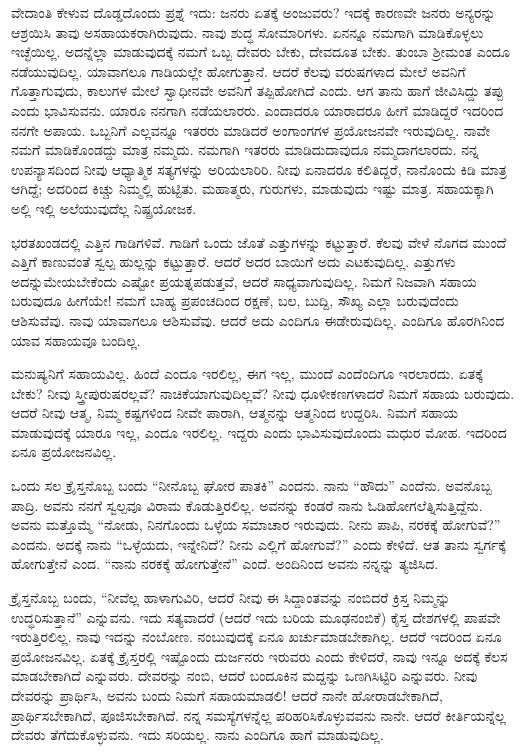 ವೇದಾಂತಿ ಕೇಳುವ ದೊಡ್ಡದೊಂದು ಪ್ರಶ್ನೆ ಇದು: ಜನರು ಏತಕ್ಕೆ ಅಂಜುವರು? ಇದಕ್ಕೆ ಕಾರಣವೇ ಜನರು ಅನ್ಯರನ್ನು ಆಶ್ರಯಿಸಿ ತಾವು ಅಸಹಾಯಕರಾಗಿರುವುದು. ನಾವು ಶುದ್ಧ ಸೋಮಾರಿಗಳು. ಏನನ್ನೂ ನಮಗಾಗಿ ಮಾಡಿಕೊಳ್ಳಲು ಇಚ್ಛೆಯಿಲ್ಲ. ಅದನ್ನೆಲ್ಲಾ ಮಾಡುವುದಕ್ಕೆ ನಮಗೆ ಒಬ್ಬ ದೇವರು ಬೇಕು, ದೇವದೂತ ಬೇಕು. ತುಂಬಾ ಶ‍್ರೀಮಂತ ಎಂದೂ ನಡೆಯುವುದಿಲ್ಲ. ಯಾವಾಗಲೂ ಗಾಡಿಯಲ್ಲೇ ಹೋಗುತ್ತಾನೆ. ಆದರೆ ಕೆಲವು ವರುಷಗಳಾದ ಮೇಲೆ ಅವನಿಗೆ ಗೊತ್ತಾಗುವುದು, ಕಾಲುಗಳ ಮೇಲೆ ಸ್ವಾಧೀನವೇ ಅವನಿಗೆ ತಪ್ಪಿಹೋಗಿದೆ ಎಂದು. ಆಗ ತಾನು ಹಾಗೆ ಜೀವಿಸಿದ್ದು ತಪ್ಪು ಎಂದು ಭಾವಿಸುವನು. ಯಾರೂ ನನಗಾಗಿ ನಡೆಯಲಾರರು. ಎಂದಾದರೂ ಯಾರಾದರೂ ಹೀಗೆ ಮಾಡಿದ್ದರೆ ಇದರಿಂದ ನನಗೇ ಅಪಾಯ. ಒಬ್ಬನಿಗೆ ಎಲ್ಲವನ್ನೂ ಇತರರು ಮಾಡಿದರೆ ಅಂಗಾಂಗಗಳ ಪ್ರಯೋಜನವೇ ಇರುವುದಿಲ್ಲ. ನಾವೇ ನಮಗೆ ಮಾಡಿಕೊಂಡದ್ದು ಮಾತ್ರ ನಮ್ಮದು. ನಮಗಾಗಿ ಇತರರು ಮಾಡಿದುದಾವುದೂ ನಮ್ಮದಾಗಲಾರದು. ನನ್ನ ಉಪನ್ಯಾಸದಿಂದ ನೀವು ಆಧ್ಯಾತ್ಮಿಕ ಸತ್ಯಗಳನ್ನು ಅರಿಯಲಾರಿರಿ. ನೀವು ಏನಾದರೂ ಕಲಿತಿದ್ದರೆ, ನಾನೊಂದು ಕಿಡಿ ಮಾತ್ರ ಆಗಿದ್ದೆ; ಅದರಿಂದ ಕಿಚ್ಚು ನಿಮ್ಮಲ್ಲಿ ಹುಟ್ಟಿತು. ಮಹಾತ್ಮರು, ಗುರುಗಳು, ಮಾಡುವುದು ಇಷ್ಟು ಮಾತ್ರ. ಸಹಾಯಕ್ಕಾಗಿ ಅಲ್ಲಿ ಇಲ್ಲಿ ಅಲೆಯುವುದೆಲ್ಲ ನಿಷ್ಪ್ರಯೋಜಕ.

ಭರತಖಂಡದಲ್ಲಿ ಎತ್ತಿನ ಗಾಡಿಗಳಿವೆ. ಗಾಡಿಗೆ ಒಂದು ಜೊತೆ ಎತ್ತುಗಳನ್ನು ಕಟ್ಟುತ್ತಾರೆ. ಕೆಲವು ವೇಳೆ ನೊಗದ ಮುಂದೆ ಎತ್ತಿಗೆ ಕಾಣುವಂತೆ ಸ್ವಲ್ಪ ಹುಲ್ಲನ್ನು ಕಟ್ಟುತ್ತಾರೆ. ಆದರೆ ಅದರ ಬಾಯಿಗೆ ಅದು ಎಟಕುವುದಿಲ್ಲ. ಎತ್ತುಗಳು ಅದನ್ನು\break ಮೇಯಬೇಕೆಂದು ಎಷ್ಟೋ ಪ್ರಯತ್ನಪಡುತ್ತವೆ, ಆದರೆ ಸಾಧ್ಯವಾಗುವುದಿಲ್ಲ. ನಿಮಗೆ ನಿಜವಾಗಿ ಸಹಾಯ ಬರುವುದೂ ಹೀಗೆಯೇ! ನಮಗೆ ಬಾಹ್ಯ ಪ್ರಪಂಚದಿಂದ ರಕ್ಷಣೆ, ಬಲ, ಬುದ್ದಿ, ಸೌಖ್ಯ ಎಲ್ಲಾ ಬರುವುದೆಂದು ಆಶಿಸುವೆವು. ನಾವು ಯಾವಾಗಲೂ ಆಶಿಸುವೆವು. ಆದರೆ ಅದು ಎಂದಿಗೂ ಈಡೇರುವುದಿಲ್ಲ. ಎಂದಿಗೂ ಹೊರಗಿನಿಂದ ಯಾವ ಸಹಾಯವೂ ಬಂದಿಲ್ಲ.

ಮನುಷ್ಯನಿಗೆ ಸಹಾಯವಿಲ್ಲ. ಹಿಂದೆ ಎಂದೂ ಇರಲಿಲ್ಲ, ಈಗ ಇಲ್ಲ, ಮುಂದೆ ಎಂದೆಂದಿಗೂ ಇರಲಾರದು. ಏತಕ್ಕೆ ಬೇಕು? ನೀವು ಸ್ತ್ರೀಪುರುಷರಲ್ಲವೆ? ನಾಚಿಕೆಯಾಗುವುದಿಲ್ಲವೆ? ನೀವು ಧೂಳೀಕಣಗಳಾದರೆ ನಿಮಗೆ ಸಹಾಯ ಬರುವುದು. ಆದರೆ ನೀವು ಆತ್ಮ, ನಿಮ್ಮ ಕಷ್ಟಗಳಿಂದ ನೀವೇ ಪಾರಾಗಿ, ಆತ್ಮನನ್ನು ಆತ್ಮನಿಂದ ಉದ್ದರಿಸಿ. ನಿಮಗೆ ಸಹಾಯ ಮಾಡುವುದಕ್ಕೆ ಯಾರೂ ಇಲ್ಲ, ಎಂದೂ ಇರಲಿಲ್ಲ. ಇದ್ದರು ಎಂದು ಭಾವಿಸುವುದೊಂದು ಮಧುರ ಮೋಹ. ಇದರಿಂದ ಏನೂ ಪ್ರಯೋಜನವಿಲ್ಲ.

ಒಂದು ಸಲ ಕ್ರೈಸ್ತನೊಬ್ಬ ಬಂದು “ನೀನೊಬ್ಬ ಘೋರ ಪಾತಕಿ'' ಎಂದನು. ನಾನು “ಹೌದು” ಎಂದೆನು. ಅವನೊಬ್ಬ ಪಾದ್ರಿ. ಅವನು ನನಗೆ ಸ್ವಲ್ಪವೂ ವಿರಾಮ ಕೊಡುತ್ತಿರಲಿಲ್ಲ. ಅವನನ್ನು ಕಂಡರೆ ನಾನು ಓಡಿಹೋಗಲೆತ್ನಿಸುತ್ತಿದ್ದೆನು. ಅವನು ಮತ್ತೊಮ್ಮೆ “ನೋಡು, ನಿನಗೊಂದು ಒಳ್ಳೆಯ ಸಮಾಚಾರ ಇರುವುದು. ನೀನು ಪಾಪಿ, ನರಕಕ್ಕೆ ಹೋಗುವೆ?'' ಎಂದನು. ಅದಕ್ಕೆ ನಾನು “ಒಳ್ಳೆಯದು, ಇನ್ನೇನಿದೆ? ನೀನು ಎಲ್ಲಿಗೆ ಹೋಗುವೆ?” ಎಂದು ಕೇಳಿದೆ. ಆತ ತಾನು ಸ್ವರ್ಗಕ್ಕೆ ಹೋಗುತ್ತೇನೆ ಎಂದ. “ನಾನು ನರಕಕ್ಕೆ ಹೋಗುತ್ತೇನೆ'' ಎಂದೆ. ಅಂದಿನಿಂದ ಅವನು ನನ್ನನ್ನು ತ್ಯಜಿಸಿದ.

ಕ್ರೈಸ್ತನೊಬ್ಬ ಬಂದು, “ನೀವೆಲ್ಲ ಹಾಳಾಗುವಿರಿ, ಆದರೆ ನೀವು ಈ ಸಿದ್ದಾಂತವನ್ನು ನಂಬಿದರೆ ಕ್ರಿಸ್ತ ನಿಮ್ಮನ್ನು ಉದ್ಧರಿಸುತ್ತಾನೆ'' ಎನ್ನುವನು. ಇದು ಸತ್ಯವಾದರೆ (ಆದರೆ ಇದು ಬರಿಯ ಮೂಢನಂಬಿಕೆ) ಕೈಸ್ತ ದೇಶಗಳಲ್ಲಿ ಪಾಪವೇ ಇರುತ್ತಿರಲಿಲ್ಲ. ನಾವು ಇದನ್ನು ನಂಬೋಣ. ನಂಬುವುದಕ್ಕೆ ಏನೂ ಖರ್ಚುಮಾಡಬೇಕಾಗಿಲ್ಲ. ಆದರೆ ಇದರಿಂದ ಏನೂ ಪ್ರಯೋಜನವಿಲ್ಲ. ಏತಕ್ಕೆ ಕ್ರೈಸ್ತರಲ್ಲಿ ಇಷ್ಟೊಂದು ದುರ್ಜನರು ಇರುವರು ಎಂದು ಕೇಳಿದರೆ, ನಾವು ಇನ್ನೂ ಅದಕ್ಕೆ ಕೆಲಸ ಮಾಡಬೇಕಾಗಿದೆ ಎನ್ನುವರು. ದೇವರನ್ನು ನಂಬಿ, ಆದರೆ ಬಂದೂಕಿನ ಮದ್ದನ್ನು ಒಣಗಿಸಿಟ್ಟಿರಿ ಎನ್ನುವರು. ನೀವು ದೇವರನ್ನು ಪ್ರಾರ್ಥಿಸಿ, ಅವನು ಬಂದು ನಿಮಗೆ ಸಹಾಯಮಾಡಲಿ! ಆದರೆ ನಾನೇ ಹೋರಾಡಬೇಕಾಗಿದೆ, ಪ್ರಾರ್ಥಿಸಬೇಕಾಗಿದೆ, ಪೂಜಿಸಬೇಕಾಗಿದೆ. ನನ್ನ ಸಮಸ್ಯೆಗಳನ್ನೆಲ್ಲ ಪರಿಹರಿಸಿಕೊಳ್ಳುವವನು ನಾನೇ. ಆದರೆ ಕೀರ್ತಿಯನ್ನೆಲ್ಲ ದೇವರು ತೆಗೆದುಕೊಳ್ಳುವನು. ಇದು ಸರಿಯಲ್ಲ. ನಾನು ಎಂದಿಗೂ ಹಾಗೆ ಮಾಡುವುದಿಲ್ಲ.

